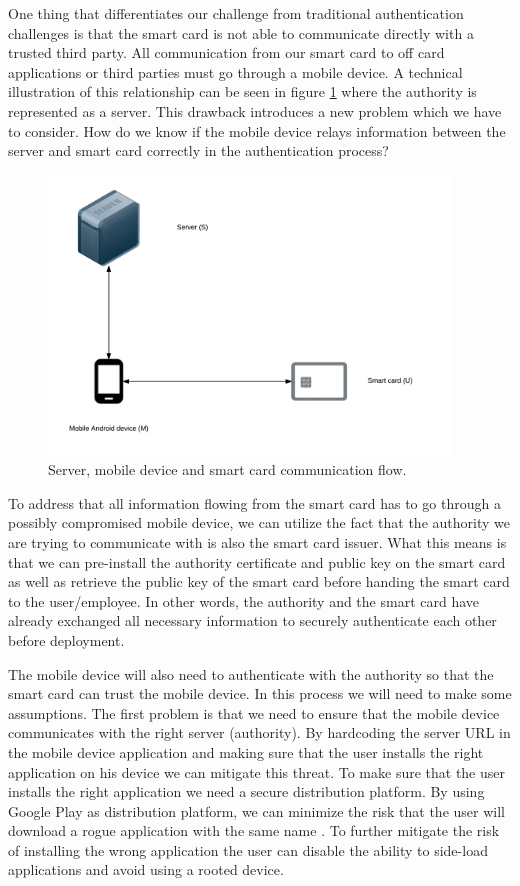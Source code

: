 One thing that differentiates our challenge from traditional authentication challenges is that the smart card is not able to communicate directly with a trusted third party. All communication from our smart card to off card applications or third parties must go through a mobile device. A technical illustration of this relationship can be seen in figure \ref{fig:smu} where the authority is represented as a server. This drawback introduces a new problem which we have to consider. How do we know if the mobile device relays information between the server and smart card correctly in the authentication process?

\begin{figure}[h!]
  \captionsetup{justification=centering,margin=1.5cm}
  \caption{Server, mobile device and smart card communication flow.}
  \label{fig:smu}
  \centering
    \includegraphics[width=0.95\textwidth]{images/SMU.png}
\end{figure}

To address that all information flowing from the smart card has to go through a possibly compromised mobile device, we can utilize the fact that the authority we are trying to communicate with is also the smart card issuer. What this means is that we can pre-install the authority certificate and public key on the smart card as well as retrieve the public key of the smart card before handing the smart card to the user/employee. In other words, the authority and the smart card have already exchanged all necessary information to securely authenticate each other before deployment.

The mobile device will also need to authenticate with the authority so that the smart card can trust the mobile device. In this process we will need to make some assumptions. The first problem is that we need to  ensure that the mobile device communicates with the right server (authority). By hardcoding the server URL in the mobile device application and making sure that the user installs the right application on his device we can mitigate this threat. To make sure that the user installs the right application we need a secure distribution platform. By using Google Play as distribution platform, we can minimize the risk that the user will download a rogue application with the same name \cite{googlePlaySecureDist}. To further mitigate the risk of installing the wrong application the user can disable the ability to side-load applications and avoid using a rooted device.

